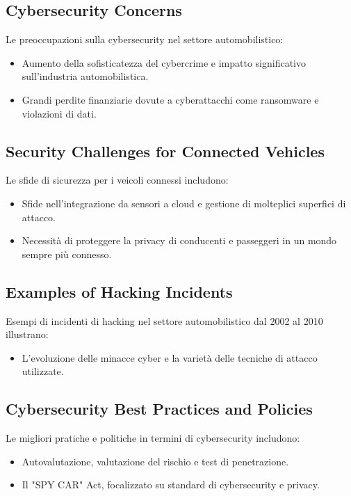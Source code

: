 \subsection{Cybersecurity Concerns}
Le preoccupazioni sulla cybersecurity nel settore automobilistico:
\begin{itemize}
  \item Aumento della sofisticatezza del cybercrime e impatto significativo sull'industria
    automobilistica.
  \item Grandi perdite finanziarie dovute a cyberattacchi come ransomware e violazioni di
    dati. 
\end{itemize}

\subsection{Security Challenges for Connected Vehicles} 
Le sfide di sicurezza per i veicoli connessi includono: 
\begin{itemize} 
  \item Sfide nell'integrazione da sensori a cloud e gestione di molteplici superfici di
    attacco. 
  \item Necessità di proteggere la privacy di conducenti e passeggeri in un mondo sempre
      più connesso.
\end{itemize}

\subsection{Examples of Hacking Incidents}
Esempi di incidenti di hacking nel settore automobilistico dal 2002 al 2010 illustrano: 
\begin{itemize} 
  \item L'evoluzione delle minacce cyber e la varietà delle tecniche di attacco
    utilizzate. 
\end{itemize}

\subsection{Cybersecurity Best Practices and Policies}
Le migliori pratiche e politiche in termini di cybersecurity includono: 
\begin{itemize} 
  \item Autovalutazione, valutazione del rischio e test di penetrazione. 
  \item Il "SPY CAR" Act, focalizzato su standard di cybersecurity e privacy. 
\end{itemize}

